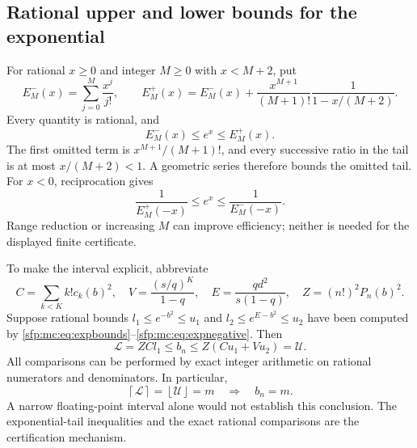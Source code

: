 \documentclass[11pt,letterpaper]{article}
\numberwithin{equation}{section}
\theoremstyle{definition}\newtheorem{definition}[theorem]{Definition}
\theoremstyle{remark}\newtheorem{remark}[theorem]{Remark}
\newcommand{\ceil}[1]{\left\lceil #1\right\rceil}
\newcommand{\floor}[1]{\left\lfloor #1\right\rfloor}
\begin{document}
\subsection{Rational upper and lower bounds for the exponential}
For rational $x\geq0$ and integer $M\geq0$ with $x<M+2$, put
\begin{equation}\label{sfp:mc:eq:expbounds}
 E_M^-(x)=\sum_{j=0}^{M}\frac{x^j}{j!},\qquad
 E_M^+(x)=E_M^-(x)+
 \frac{x^{M+1}}{(M+1)!}\frac1{1-x/(M+2)}.
\end{equation}
Every quantity is rational, and
\begin{equation}\label{sfp:mc:eq:expineq}
 E_M^-(x)\leq e^x\leq E_M^+(x).
\end{equation}
The first omitted term is $x^{M+1}/(M+1)!$, and every successive
ratio in the tail is at most $x/(M+2)<1$. A geometric series
therefore bounds the omitted tail. For $x<0$, reciprocation gives
\begin{equation}\label{sfp:mc:eq:expnegative}
 \frac1{E_M^+(-x)}\leq e^x\leq\frac1{E_M^-(-x)}.
\end{equation}
Range reduction or increasing $M$ can improve efficiency; neither
is needed for the displayed finite certificate.

To make the interval explicit, abbreviate
\[
 C=\sum_{k<K}k!c_k(b)^2,\quad
 V=\frac{(s/q)^K}{1-q},\quad
 E=\frac{qd^2}{s(1-q)},\quad
 Z=(n!)^2P_n(b)^2.
\]
Suppose rational bounds $l_1\leq e^{-b^2}\leq u_1$ and
$l_2\leq e^{E-b^2}\leq u_2$ have been computed by
\eqref{sfp:mc:eq:expbounds}--\eqref{sfp:mc:eq:expnegative}. Then
\begin{equation}\label{sfp:mc:eq:fullyrational}
 \mathcal L=ZCl_1\leq b_n\leq Z(Cu_1+Vu_2)=\mathcal U.
\end{equation}
All comparisons can be performed by exact integer arithmetic on
rational numerators and denominators. In particular,
\begin{equation}\label{sfp:mc:eq:uniqueinteger}
 \ceil{\mathcal L}=\floor{\mathcal U}=m
 \quad\Longrightarrow\quad b_n=m.
\end{equation}
A narrow floating-point interval alone would not establish this
conclusion. The exponential-tail inequalities and the exact
rational comparisons are the certification mechanism.
\end{document}
